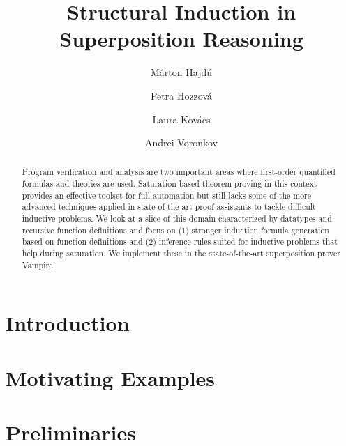 \documentclass[runningheads]{llncs}
\begin{document}
%
\title{Structural Induction in Superposition Reasoning}
%
\titlerunning{ }
%
\author{M\'arton Hajd\'{u} \and Petra Hozzov\'a \and
  Laura Kov\'acs \and Andrei Voronkov}
%
\authorrunning{ }
%

%

\maketitle              %
%
\begin{abstract}

Program verification and analysis are two important areas where first-order quantified formulas and theories are used. Saturation-based theorem proving in this context provides an effective toolset for full automation but still lacks some of the more advanced techniques applied in state-of-the-art proof-assistants to tackle difficult inductive problems. We look at a slice of this domain characterized by datatypes and recursive function definitions and focus on (1) stronger induction formula generation based on function definitions and (2) inference rules suited for inductive problems that help during saturation. We implement these in the state-of-the-art superposition prover Vampire.
\end{abstract}

\section{Introduction}


\section{Motivating Examples}
\label{sec:motivating}


\section{Preliminaries}
\label{sec:preliminaries}

\end{document}
